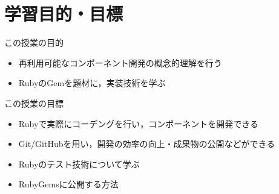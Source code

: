 \documentclass[t, aspectratio=169]{beamer}
\begin{document}
\section{学習目的・目標}
\label{sec-1-2}
\begin{frame}[label=sec-1-2-1]{この授業の目的}
\begin{itemize}
\item 再利用可能なコンポーネント開発の概念的理解を行う
\item RubyのGemを題材に，実装技術を学ぶ
\end{itemize}
\end{frame}

\begin{frame}[label=sec-1-2-2]{この授業の目標}
\begin{itemize}
\item Rubyで実際にコーデングを行い，コンポーネントを開発できる
\item Git/GitHubを用い，開発の効率の向上・成果物の公開などができる
\item Rubyのテスト技術について学ぶ
\item RubyGemsに公開する方法
\end{itemize}
\end{frame}
\end{document}
